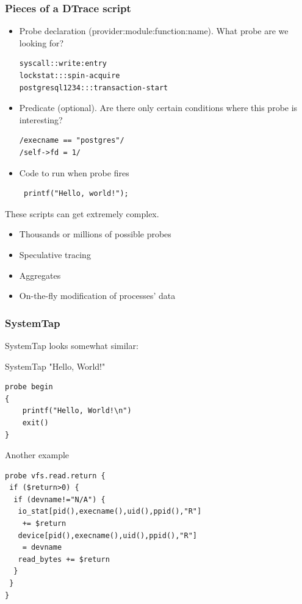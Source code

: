 \documentclass{beamer}
\begin{document}
\begin{frame}[fragile]
    \frametitle{Pieces of a DTrace script}
    \begin{itemize}
         \item<1-> Probe declaration (provider:module:function:name). What probe are we looking for?
         \begin{verbatim}
syscall::write:entry
lockstat:::spin-acquire
postgresql1234:::transaction-start
         \end{verbatim}
         \item<2-> Predicate (optional). Are there only certain conditions where this probe is interesting?
         \begin{verbatim}
/execname == "postgres"/
/self->fd = 1/
         \end{verbatim}
         \item<3-> Code to run when probe fires
         \begin{verbatim}
 printf("Hello, world!");
         \end{verbatim}
    \end{itemize}
\end{frame}

\begin{frame}
     These scripts can get extremely complex.
     \begin{itemize}
         \item Thousands or millions of possible probes
         \item Speculative tracing
         \item Aggregates
         \item On-the-fly modification of processes' data
     \end{itemize}
\end{frame}

\begin{frame}[fragile]
     \frametitle{SystemTap}
     SystemTap looks somewhat similar:
     \begin{exampleblock}{SystemTap "Hello, World!"}
     \begin{lstlisting}
probe begin
{
    printf("Hello, World!\n")
    exit()
}
     \end{lstlisting}
     \end{exampleblock}
\end{frame}

\begin{frame}[fragile]
     \begin{exampleblock}{Another example}
     \begin{lstlisting}
probe vfs.read.return {
 if ($return>0) {
  if (devname!="N/A") {
   io_stat[pid(),execname(),uid(),ppid(),"R"]
    += $return
   device[pid(),execname(),uid(),ppid(),"R"]
    = devname
   read_bytes += $return
  }
 }
}
     \end{lstlisting}
     \end{exampleblock}
\end{frame}
\end{document}
